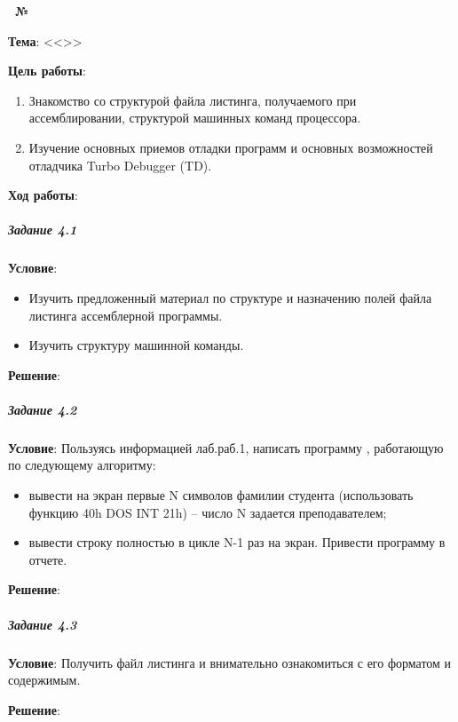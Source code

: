 \begin{center}
   \textbf{\titlePageWorkType~№\titlePageWorkNumber~\titlePageWorkPart}
\end{center}

\textbf{Тема}: <<\titlePageTopic>>

\textbf{Цель работы}: 

\begin{enumerate}
   \item Знакомство со структурой файла листинга, получаемого при ассемблировании, структурой машинных команд процессора.
   \item Изучение основных приемов отладки программ и основных возможностей отладчика Turbo Debugger (TD).
\end{enumerate}

\begin{center}
   \textbf{Ход работы}:
\end{center}



\subparagraph{Задание 4.1}

\textbf{Условие}:
\begin{itemize}
   \item Изучить предложенный материал по структуре и назначению полей файла листинга ассемблерной программы. 
   \item Изучить структуру машинной команды.
\end{itemize}

\textbf{Решение}:



\subparagraph{Задание 4.2}

\textbf{Условие}:
Пользуясь информацией лаб.раб.1, написать программу , работающую по следующему алгоритму:
\begin{itemize}
   \item вывести на экран первые N символов фамилии студента (использовать функцию 40h DOS INT 21h) – число N задается преподавателем;
   \item вывести строку полностью в цикле N-1 раз на экран. Привести программу в отчете.
\end{itemize}

\textbf{Решение}:



\subparagraph{Задание 4.3}

\textbf{Условие}:
Получить файл листинга и внимательно ознакомиться с его форматом и содержимым.

\textbf{Решение}:



